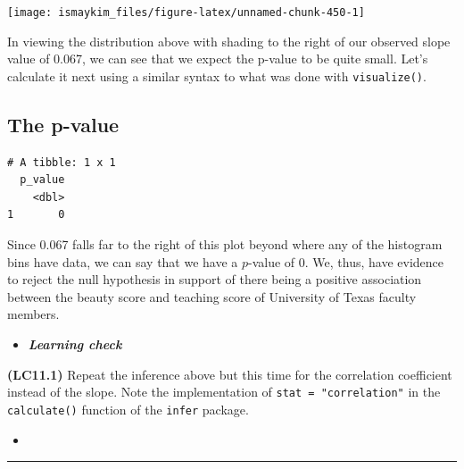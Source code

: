 \documentclass[12pt, krantz2,]{krantz}
\makeatletter
\newenvironment{Shaded}{\begin{snugshade}}{\end{snugshade}}
\newcommand{\DataTypeTok}[1]{\textcolor[rgb]{0.27,0.27,0.27}{#1}}
\newcommand{\KeywordTok}[1]{\textcolor[rgb]{0.27,0.27,0.27}{\textbf{#1}}}
\newcommand{\NormalTok}[1]{#1}
\newcommand{\OperatorTok}[1]{\textcolor[rgb]{0.43,0.43,0.43}{\textbf{#1}}}
\newcommand{\StringTok}[1]{\textcolor[rgb]{0.5,0.5,0.5}{#1}}
\newenvironment{kframe}{%
\medskip{}
\setlength{\fboxsep}{.8em}
 \def\at@end@of@kframe{}%
 \ifinner\ifhmode%
  \def\at@end@of@kframe{\end{minipage}}%
  \begin{minipage}{\columnwidth}%
 \fi\fi%
 \def\FrameCommand##1{\hskip\@totalleftmargin \hskip-\fboxsep
 \colorbox{shadecolor}{##1}\hskip-\fboxsep
     \hskip-\linewidth \hskip-\@totalleftmargin \hskip\columnwidth}%
 \MakeFramed {\advance\hsize-\width
   \@totalleftmargin\z@ \linewidth\hsize
   \@setminipage}}%
 {\par\unskip\endMakeFramed%
 \at@end@of@kframe}
\renewenvironment{Shaded}{\begin{kframe}}{\end{kframe}}
\newenvironment{rmdblock}[1]
  {\begin{shaded*}
  \begin{itemize}
  \renewcommand{\labelitemi}{
    \raisebox{-.7\height}[0pt][0pt]{
    }
  }
  \item
  }
  {
  \end{itemize}
  \end{shaded*}
  }
\newenvironment{learncheck}
  {\begin{rmdblock}{warning}}
  {\end{rmdblock}}
\makeatother
\begin{document}
\begin{center}\texttt{[image: ismaykim\_files/figure-latex/unnamed-chunk-450-1]} \end{center}

In viewing the distribution above with shading to the right of our observed slope value of 0.067, we can see that we expect the p-value to be quite small. Let's calculate it next using a similar syntax to what was done with \texttt{visualize()}.

\hypertarget{the-p-value-1}{%
\subsection{The p-value}\label{the-p-value-1}}

\begin{Shaded}
\end{Shaded}

\begin{verbatim}
# A tibble: 1 x 1
  p_value
    <dbl>
1       0
\end{verbatim}

Since 0.067 falls far to the right of this plot beyond where any of the histogram bins have data, we can say that we have a \(p\)-value of 0. We, thus, have evidence to reject the null hypothesis in support of there being a positive association between the beauty score and teaching score of University of Texas faculty members.

\begin{learncheck}
\textbf{\emph{Learning check}}
\end{learncheck}

\textbf{(LC11.1)} Repeat the inference above but this time for the correlation coefficient instead of the slope. Note the implementation of \texttt{stat\ =\ "correlation"} in the \texttt{calculate()} function of the \texttt{infer} package.

\begin{learncheck}

\end{learncheck}

\begin{center}\rule{0.5\linewidth}{\linethickness}\end{center}
\end{document}
